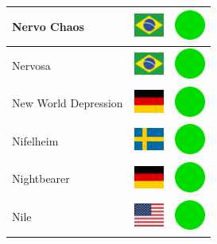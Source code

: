 \documentclass[12pt, a4paper, twoside]{report}
\begin{document}
\begin{center}
\begin{longtable}{|p{5cm}|p{2cm}|p{2cm}|}
 Nervo Chaos                                                & \includegraphics[width=1cm]{../img/flags/br} &   \includegraphics[width=1cm]{../likes/y} \\ \hline
 Nervosa                                                    & \includegraphics[width=1cm]{../img/flags/br} &   \includegraphics[width=1cm]{../likes/y} \\ \hline
 New World Depression                                       & \includegraphics[width=1cm]{../img/flags/de} &   \includegraphics[width=1cm]{../likes/y} \\ \hline
 Nifelheim                                                  & \includegraphics[width=1cm]{../img/flags/se} &   \includegraphics[width=1cm]{../likes/y} \\ \hline
 Nightbearer                                                & \includegraphics[width=1cm]{../img/flags/de} &   \includegraphics[width=1cm]{../likes/y} \\ \hline
 Nile                                                       & \includegraphics[width=1cm]{../img/flags/us} &   \includegraphics[width=1cm]{../likes/y} \\ \hline

\end{longtable}
\end{center}
\end{document}
